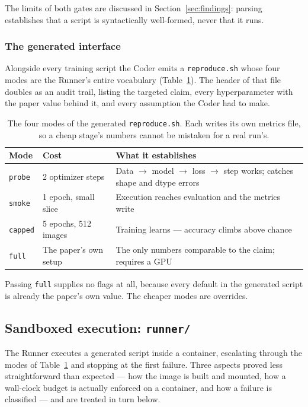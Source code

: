 \documentclass[11pt]{article}
\begin{document}
The limits of both gates are discussed in Section~\ref{sec:findings}: parsing establishes
that a script is syntactically well-formed, never that it runs.

\subsubsection{The generated interface}

Alongside every training script the Coder emits a \texttt{reproduce.sh} whose four modes
are the Runner's entire vocabulary (Table~\ref{tab:modes}). The header of that file
doubles as an audit trail, listing the targeted claim, every hyperparameter with the paper
value behind it, and every assumption the Coder had to make.

\begin{table}[htbp]
\centering
\small
\caption{The four modes of the generated \texttt{reproduce.sh}. Each writes its own
metrics file, so a cheap stage's numbers cannot be mistaken for a real run's.}
\label{tab:modes}
\begin{tabular}{lll}
\toprule
Mode & Cost & What it establishes \\
\midrule
\texttt{probe}  & 2 optimizer steps      & Data $\to$ model $\to$ loss $\to$ step works;
                                           catches shape and dtype errors \\
\texttt{smoke}  & 1 epoch, small slice   & Execution reaches evaluation and the metrics
                                           write \\
\texttt{capped} & 5 epochs, 512 images   & Training learns --- accuracy climbs above
                                           chance \\
\texttt{full}   & The paper's own setup  & The only numbers comparable to the claim;
                                           requires a GPU \\
\bottomrule
\end{tabular}
\end{table}

Passing \texttt{full} supplies no flags at all, because every default in the generated
script is already the paper's own value. The cheaper modes are overrides.

\subsection{Sandboxed execution: \texttt{runner/}}

The Runner executes a generated script inside a container, escalating through the modes of
Table~\ref{tab:modes} and stopping at the first failure. Three aspects proved less
straightforward than expected --- how the image is built and mounted, how a wall-clock
budget is actually enforced on a container, and how a failure is classified --- and are
treated in turn below.
\end{document}
